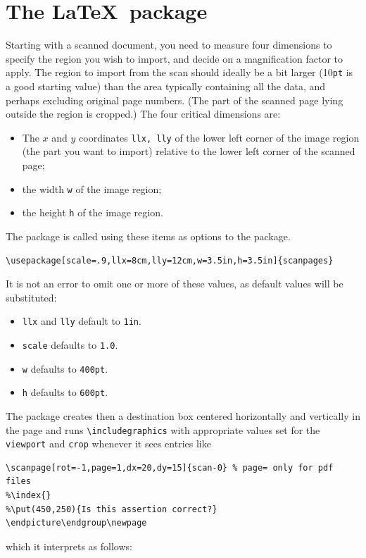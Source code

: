 \documentclass[11pt]{article}
\begin{document}
\section{The \LaTeX\ package}
Starting with a scanned document, you need to measure four dimensions to specify the region you wish to import, and decide on a magnification factor to apply. The region to import from the scan should ideally be a bit larger (10{\tt pt} is a good starting value) than the area typically containing all the data, and perhaps excluding original page numbers. (The part of the scanned page lying outside the region is cropped.) The four critical dimensions are:
\begin{itemize}
\item
The $x$ and $y$ coordinates {\tt llx, lly} of the lower left corner of the image region (the part you want to  import) relative to the lower left corner of the scanned page;
\item the width {\tt w} of the image region;
\item the height {\tt h} of the image region. 
\end{itemize}
The package is called using these items as options to the package.
\begin{verbatim}
\usepackage[scale=.9,llx=8cm,lly=12cm,w=3.5in,h=3.5in]{scanpages}
\end{verbatim}
It is not an error to omit one or more of these values, as default values will be substituted:
\begin{itemize}
\item
{\tt llx} and {\tt lly} default to {\tt 1in}.
\item {\tt scale} defaults to {\tt 1.0}.
\item {\tt w} defaults to {\tt 400pt}.
\item {\tt h} defaults to {\tt 600pt}.
\end{itemize}
The package creates then a destination box centered horizontally and vertically in the page and runs \verb|\includegraphics| with  appropriate values set for the {\tt viewport} and {\tt crop} whenever it sees entries like
\begin{verbatim}
\scanpage[rot=-1,page=1,dx=20,dy=15]{scan-0} % page= only for pdf files
%\index{}
%\put(450,250){Is this assertion correct?}
\endpicture\endgroup\newpage
\end{verbatim}
which it interprets as follows:
\end{document}
